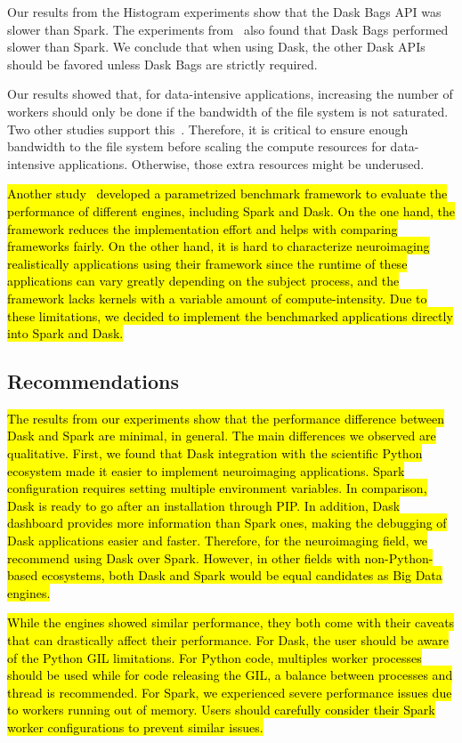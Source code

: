 \documentclass[AMA,STIX1COL]{WileyNJD-v2}
\newcommand{\HL}[1]{\hl{#1}}
\begin{document}
Our results from the Histogram experiments show that the Dask Bags API was slower than Spark.
The experiments from~\cite{10.1145/3225058.3225128} also found that Dask Bags performed slower than Spark.
We conclude that when using Dask, the other Dask APIs should be favored unless Dask Bags are strictly required.
																	
Our results showed that, for data-intensive applications, increasing the number of workers should only be done if the bandwidth of the file system is not saturated.
Two other studies support this~\cite{8943502, 8588652}.
Therefore, it is critical to ensure enough bandwidth to the file system before scaling the compute resources for data-intensive applications.
Otherwise, those extra resources might be underused.

\HL{
	Another study~{\cite{Slaughter2020-ql}} developed a parametrized benchmark framework
	to evaluate the performance of different engines, including Spark and Dask.
	On the one hand, the framework reduces the implementation effort and helps with
	comparing frameworks fairly.
	On the other hand, it is hard to characterize neuroimaging realistically
	applications using their framework since the runtime of these applications can vary
	greatly depending on the subject process, and the framework lacks kernels with
	a variable amount of compute-intensity.
	Due to these limitations, we decided to implement the benchmarked applications
	directly into Spark and Dask.
}
				
\subsection{Recommendations}
\HL{
	The results from our experiments show that the performance difference between
	Dask and Spark are minimal, in general. 
	The main differences we observed are qualitative.
	First, we found that Dask integration with the scientific Python ecosystem made it
	easier to implement neuroimaging applications.
	Spark configuration requires setting multiple environment variables.
	In comparison, Dask is ready to go after an installation through PIP.
	In addition, Dask dashboard provides more information than Spark ones, making
	the debugging of Dask applications easier and faster.
	Therefore, for the neuroimaging field, we recommend using Dask over Spark.
	However, in other fields with non-Python-based ecosystems, both Dask and Spark
	would be equal candidates as Big Data engines.
}

\HL{
	While the engines showed similar performance, they both come with their caveats that
	can drastically affect their performance.
	For Dask, the user should be aware of the Python GIL limitations.
	For Python code, multiples worker processes should be used while for code releasing the
	GIL, a balance between processes and thread is recommended.
	For Spark, we experienced severe performance issues due to workers running out of memory.
	Users should carefully consider their Spark worker configurations to prevent similar issues.
}
											
\end{document}
